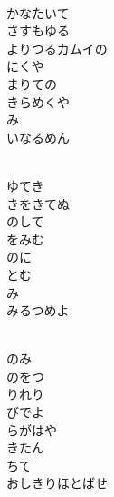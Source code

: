 \documentclass[10pt,b5j]{tarticle} %
\begin{document}
\vspace{1.5em} %
\newcommand{\linespace}{0.5em} %
\newcommand{\blocksize}{0.5\hsize} %
\newcommand{\itemmargin}{6em} %
\begin{enumerate} %
    \setlength{\itemindent}{\itemmargin} %
    \begin{minipage}[c]{\blocksize}
    
        \vspace{\linespace}
        \item~\\
        かなたいて\\
        さすもゆる\\
        よりつるカムイの\\
        にくや\\
        まりての\\
        きらめくや\\
        み\\
        いなるめん
        
        \vspace{\linespace}
        \item~\\
        ゆてき\\
        きをきてぬ\\
        のして\\
        をみむ\\
        のに\\
        とむ\\
        み\\
        みるつめよ
        
        \vspace{\linespace}
        \item~\\
        のみ\\
        のをつ\\
        りれり\\
        びでよ\\
        らがはや\\
        きたん\\
        ちて\\
        おしきりほとばせ
    
    \end{minipage}
\end{enumerate} %
\end{document}
